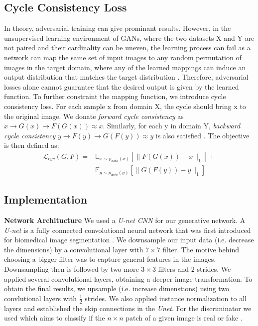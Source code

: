 \documentclass[10pt,twocolumn,letterpaper]{article}
\begin{document}
\subsection{Cycle Consistency Loss}
In theory, adversarial training can give prominant results. However, in the unsupervised learning environment of GANs, where the two datasets X and Y are not paired and their cardinality can be uneven, the learning process can fail as a network can map the same set of input images to any random permutation of images in the target domain, where any of the learned mappings can induce an output distribution that matches the target distribution \cite{cyclegan}. Therefore, adversarial losses alone cannot guarantee that the desired output is given by the learned function. To further constraint the mapping function, we introduce cycle consistency loss. For each sample x from domain X, the cycle should bring x to the original image. We donate \emph{forward cycle consistency} as $x \rightarrow G(x)\rightarrow F(G(x)) \approx x$. Similarly, for each y in domain Y, \emph{backward cycle consistency} $y \rightarrow F(y)\rightarrow G(F(y)) \approx y$ is also satisfied \cite{cyclegan}. The objective is then defined as:
\begin{equation}
	\begin{split}
		\mathcal{L}_{cyc}(G,F) = & \mathbb{E}_{x \sim p_{data}(x)} [\| F(G(x))-x \| _1] + \\
				& \mathbb{E}_{y \sim p_{data}(y)} [\| G(F(y))-y \| _1]
	\end{split}
\end{equation}


\subsection{Implementation}
\textbf{Network Architucture} We used a \textit{U-net CNN} for our generative network. A \textit{U-net} is a fully connected convolutional neural network that was first introduced for biomedical image segmentation \cite{unet}. We downsample our input data (i.e. decrease the dimensions) by a convolutional layer with $7 \times 7$ filter. The motive behind choosing a bigger filter was to capture general features in the images. Downsampling then is followed by two more $3 \times 3$ filters and 2-strides. We applied several convolutional layers, obtaining a deeper image transformation.   To obtain the final results, we upsample (i.e. increase dimenstions) using two convlutional layers with $\frac{1}{2}$ strides. We also applied instance normalization \cite{insnorm} to all layers and established the skip connections in the \textit{Unet}. For the discriminator we used  which aims to classify if the $n \times n$ patch of a given image is real or fake \cite{imgtoimg}. 
\end{document}

